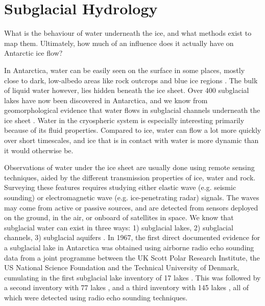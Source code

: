 
\section{Subglacial Hydrology}

What is the behaviour of water underneath the ice, and what methods exist to map them.
Ultimately, how much of an influence does it actually have on Antarctic ice flow?

In Antarctica, water can be easily seen on the surface in some places, mostly close to dark, low-albedo areas like rock outcrops and blue ice regions \citep{KingslakeWidespreadmovementmeltwater2017}.
The bulk of liquid water however, lies hidden beneath the ice sheet.
Over 400 subglacial lakes have now been discovered in Antarctica, and we know from geomorphological evidence that water flows in subglacial channels underneath the ice sheet \citep{SiegertRecentadvancesunderstanding2016}.
Water in the cryospheric system is especially interesting primarily because of its fluid properties.
Compared to ice, water can flow a lot more quickly over short timescales, and ice that is in contact with water is more dynamic than it would otherwise be.

Observations of water under the ice sheet are usually done using remote sensing techniques, aided by the different transmission properties of ice, water and rock.
Surveying these features requires studying either elastic wave (e.g. seismic sounding) or electromagnetic wave (e.g. ice-penetrating radar) signals.
The waves may come from active or passive sources, and are detected from sensors deployed on the ground, in the air, or onboard of satellites in space.
We know that subglacial water can exist in three ways: 1) subglacial lakes, 2) subglacial channels, 3) subglacial aquifers \citep{ColleoniSpatiotemporalvariabilityprocesses2018}.
In 1967, the first direct documented evidence for a subglacial lake in Antarctica was obtained using airborne radio echo sounding data \citep{RobinInterpretationRadioEcho1969} from a joint programme between the UK Scott Polar Research Institute, the US National Science Foundation and the Technical University of Denmark, cumulating in the first subglacial lake inventory of 17 lakes \citep{OswaldLakesAntarcticIce1973}.
This was followed by a second inventory with 77 lakes \citep{SiegertinventoryAntarcticsubglacial1996}, and a third inventory with 145 lakes \citep{SiegertrevisedinventoryAntarctic2005}, all of which were detected using radio echo sounding techniques.

